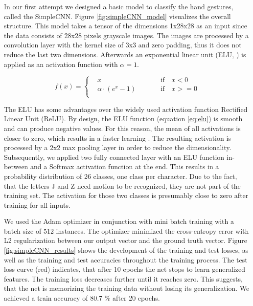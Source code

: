 \documentclass[a4paper]{article}
\begin{document}
In our first attempt we designed a basic model to classify the hand gestures, called the SimpleCNN. Figure \ref{fig:simpleCNN_model} visualizes the overall structure. This model takes a tensor of the dimensions 1x28x28 as an input since the data consists of 28x28 pixels grayscale images. The images are processed by a convolution layer with the kernel size of 3x3 and zero padding, thus it does not reduce the last two dimensions. Afterwards an exponential linear unit (ELU, \cite{clevert2015fast}) is applied as an activation function with $\alpha = 1$.
\vspace{-0.2cm}

\begin{equation}\label{eq:elu}
f(x) = \left\{\begin{alignedat}{2}
    & x && \qquad \text{if} \quad x < 0\\
    & \alpha \cdot (e^x - 1) && \qquad \text{if} \quad x >= 0\\
  \end{alignedat}\right.
\end{equation}

The ELU has some advantages over the widely used activation function Rectified Linear Unit (ReLU). By design, the ELU function (equation \ref{eq:elu}) is smooth and can produce negative values. For this reason, the mean of all activations is closer to zero, which results in a faster learning \cite{clever2015fast}.
The resulting activation is processed by a 2x2 max pooling layer in order to reduce the dimensionality. Subsequently, we applied two fully connected layer with an ELU function in-between and a Softmax activation function at the end. This results in a probability distribution of 26 classes, one class per character. Due to the fact, that the letters J and Z need motion to be recognized, they are not part of the training set. The activation for those two classes is presumably close to zero after training for all inputs.

We used the Adam optimizer \cite{Kingma2014} in conjunction with mini batch training with a batch size of 512 instances. The optimizer minimized the cross-entropy error with L2 regularization between our output vector and the ground truth vector. 
Figure \ref{fig:simpleCNN_results} shows the development of the training and test losses, as well as the training and test accuracies throughout the training process. The test loss curve (red) indicates, that after 10 epochs the net stops to learn generalized features. The training loss decreases further until it reaches zero. This suggests, that the net is memorizing the training data without losing its generalization. We achieved a train accuracy of 80.7 \% after 20 epochs.
\end{document}
